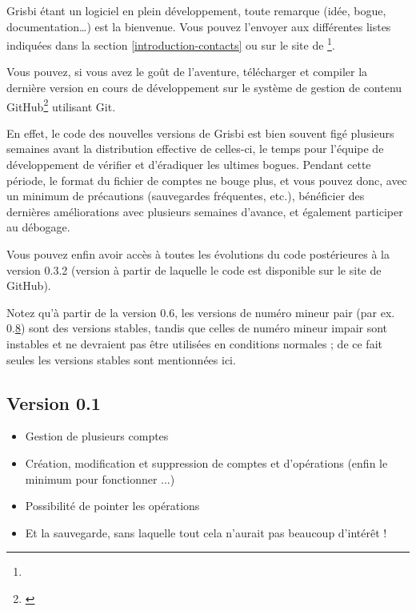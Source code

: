 Grisbi étant un logiciel en plein développement, toute remarque (idée,
bogue, documentation\dots) est la bienvenue. Vous pouvez l'envoyer aux différentes listes indiquées dans la section \vref{introduction-contacts}  ou sur le site de \footnote{\urlGrisbi{}}.

Vous pouvez, si vous avez le goût de l'aventure, télécharger et compiler la dernière version en 
cours de développement sur le système de gestion de contenu \gls{GitHub}\footnote{\urlGitHubGrisbi{}\label{siteGitHubGrisbi}} utilisant \gls{Git}.

En effet, le code des nouvelles versions de Grisbi est bien souvent figé
plusieurs semaines avant la distribution effective de celles-ci, le temps pour 
l'équipe de développement de vérifier et d'éradiquer les ultimes bogues. Pendant cette période, le format du fichier de comptes ne bouge plus, et vous pouvez donc, avec un minimum de précautions (sauvegardes fréquentes, etc.), bénéficier des dernières améliorations avec plusieurs semaines d'avance, et également participer au débogage.

Vous pouvez enfin avoir accès à toutes les évolutions du code postérieures à la version 0.3.2 (version à partir de laquelle le code est disponible sur le site de \gls{GitHub}).

Notez qu'à partir de la version 0.6, les versions de numéro mineur pair (par ex. 0.\underline8) sont des versions stables, tandis que celles de numéro mineur impair sont instables et ne devraient pas être utilisées en conditions normales ; de ce fait seules les versions stables sont mentionnées ici.

\newpage

\subsection{Version 0.1}

\begin{itemize}
	\item Gestion de plusieurs comptes
	\item Création, modification et suppression de comptes et d'opérations (enfin le minimum pour fonctionner ...)
	\item Possibilité de pointer les opérations
	\item Et la sauvegarde, sans laquelle tout cela n'aurait pas beaucoup d'intérêt !
\end{itemize}

